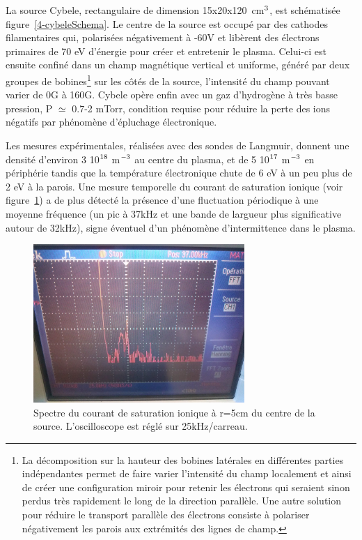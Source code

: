 \begin{refsection}
La source Cybele, rectangulaire de dimension 
15x20x120~cm$^{{3}}$, est schématisée 
figure~\ref{4-cybeleSchema}. Le centre de la source est
occupé par des cathodes filamentaires qui, polarisées négativement à -60V et
libèrent des électrons primaires de 70 eV
d'énergie pour créer et entretenir le plasma.
Celui-ci est ensuite confiné dans un champ magnétique vertical et uniforme, généré par deux
groupes de bobines\footnote{La décomposition sur la hauteur des bobines
latérales en différentes parties indépendantes permet de faire varier l'intensité du champ
localement et ainsi de créer une configuration miroir pour retenir les
électrons qui seraient sinon perdus très rapidement le long de la direction
parallèle. Une autre solution pour réduire le transport parallèle des électrons
consiste à polariser négativement les parois aux extrémités des lignes de
champ.} sur les côtés de la source, l'intensité du champ pouvant varier de 0G à
160G. Cybele opère enfin avec un gaz d'hydrogène à très basse pression,
P $\simeq$ 0.7-2 mTorr, condition requise pour réduire la perte des ions
négatifs par phénomène d'épluchage électronique.

Les mesures expérimentales, réalisées avec des sondes de Langmuir, donnent une
densité d'environ 3 10$^{{18}}$ m$^{{-3}}$ au centre du plasma, et de 5
10$^{{17}}$ m$^{{-3}}$ en périphérie tandis que la température
électronique chute de 6 eV à un peu plus de 2 eV à la parois. Une mesure
temporelle du courant de saturation ionique (voir
figure~\ref{4-CybeleFourierSignal}) a de plus détecté la
présence d'une fluctuation périodique à une moyenne fréquence (un pic à
37kHz et une bande de largueur plus significative autour de 32kHz), signe
éventuel d'un phénomène d'intermittence dans le plasma.

\begin{figure}[htbp]
  \centering
    \includegraphics[height=6cm]{figures/4-CybeleFourierSignal.jpg}
    \caption{Spectre du courant de saturation
    ionique à r=5cm du centre de la source.
    L'oscilloscope est réglé sur 25kHz/carreau.\label{4-CybeleFourierSignal}}
\end{figure}


\end{refsection}
